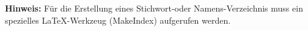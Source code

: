 
\textbf{Hinweis:} Für die Erstellung eines Stichwort-oder Namens-Verzeichnis muss ein spezielles \LaTeX-Werkzeug (MakeIndex) aufgerufen werden. 
